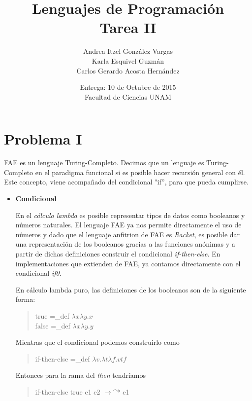 \documentclass[12pt]{article}
\title{Lenguajes de Programación \\ Tarea II}
\author{Andrea Itzel González Vargas \\ Karla Esquivel Guzmán \\ Carlos Gerardo Acosta Hernández}
\date{Entrega: 10 de Octubre de 2015 \\ Facultad de Ciencias UNAM}
\begin{document}
\maketitle
\section*{Problema I}
FAE es un lenguaje Turing-Completo. Decimos que un lenguaje es Turing-Completo en el paradigma funcional si es posible hacer recursión general con él. Este concepto, viene acompañado del condicional "if'', para que pueda cumplirse. \par
\begin{itemize}
\item \textbf{Condicional}\par
  En el \textit{cálculo lambda} es posible representar tipos de datos como booleanos y números naturales. El lenguaje FAE ya nos permite directamente el uso de números y dado que el lenguaje anfitrion de FAE es \textit{Racket}, es posible dar una representación de los booleanos gracias a las funciones anónimas y a partir de dichas definiciones construir el condicional \textit{if-then-else}. En implementaciones que extienden de FAE, ya contamos directamente con el condicional \textit{if0}.\\ \par
  En cálculo lambda puro, las definiciones de los booleanos son de la siguiente forma: \par
  \begin{quote}
  true =_{def} \;\;$\lambda x\lambda y.x$ \\
  false =_{def} \;\;$\lambda x\lambda y.y$\par
  \end{quote}
  Mientras que el condicional podemos construirlo como\\
  \begin{quote}
    if-then-else =_{def} \;\;$\lambda v.\lambda t\lambda f.vtf$ \par
  \end{quote}
  
  Entonces para la rama del \textit{then} tendríamos \\
  \begin{quote}
    if-then-else true e1 e2 $\to$^* \;\; e1\par
  \end{quote}
  

\end{itemize}
\end{document}
